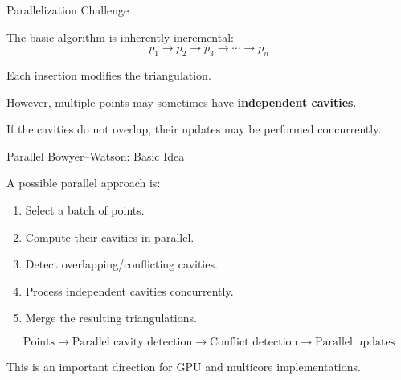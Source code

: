 \documentclass[aspectratio=169]{beamer}
\begin{document}
\begin{frame}{Parallelization Challenge}

The basic algorithm is inherently incremental:
\[
p_1
\rightarrow
p_2
\rightarrow
p_3
\rightarrow
\cdots
\rightarrow
p_n
\]

Each insertion modifies the triangulation.

\vspace{0.4cm}

However, multiple points may sometimes have \textbf{independent cavities}.

\begin{center}
\end{center}

If the cavities do not overlap, their updates may be performed concurrently.

\end{frame}
\begin{frame}{Parallel Bowyer--Watson: Basic Idea}

A possible parallel approach is:

\begin{enumerate}
    \item Select a batch of points.
    \item Compute their cavities in parallel.
    \item Detect overlapping/conflicting cavities.
    \item Process independent cavities concurrently.
    \item Merge the resulting triangulations.
\end{enumerate}

\begin{center}
\[
\boxed{
\text{Points}
\rightarrow
\text{Parallel cavity detection}
\rightarrow
\text{Conflict detection}
\rightarrow
\text{Parallel updates}
}
\]
\end{center}
\vspace{0.4cm}

This is an important direction for GPU and multicore implementations.

\end{frame}
\end{document}

